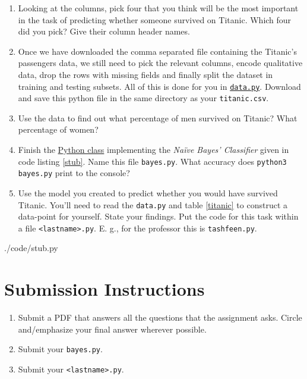 \documentclass{homework}
\begin{document}
\begin{enumerate}
  \item Looking at the columns, pick four that you think will be the most important in the task of predicting whether someone survived on Titanic. Which four did you pick? Give their column header names.
  \item Once we have downloaded the comma separated file containing the Titanic's passengers data, we still need to pick the relevant columns, encode qualitative data, drop the rows with missing fields and finally split the dataset in training and testing subsets. All of this is done for you in \href{https://tashfeen.org/raw/share/ml/data.py}{\texttt{data.py}}. Download and save this python file in the same directory as your \texttt{titanic.csv}.
  \item Use the data to find out what percentage of men survived on Titanic? What percentage of women?
  \item Finish the \href{https://tashfeen.org/raw/share/ml/stub.py}{Python class} implementing the \textit{Na\"ive Bayes' Classifier} given in code listing \ref{stub}. Name this file \texttt{bayes.py}. What accuracy does \texttt{python3 bayes.py} print to the console?
  \item Use the model you created to predict whether you would have survived Titanic. You'll need to read the \texttt{data.py} and table \ref{titanic} to construct a data-point for yourself. State your findings. Put the code for this task within a file \texttt{<lastname>.py}. E. g., for the professor this is \texttt{tashfeen.py}.
\end{enumerate}


{./code/stub.py}

\section*{Submission Instructions}
\begin{enumerate}
    \item Submit a PDF that answers all the questions that the assignment asks. Circle and/emphasize your final answer wherever possible.
    \item Submit your \texttt{bayes.py}.
    \item Submit your \texttt{<lastname>.py}.
\end{enumerate}
\end{document}
